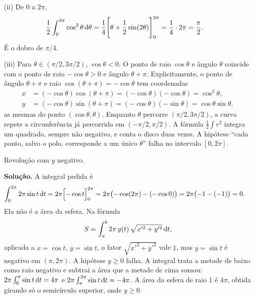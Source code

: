 \documentclass[11pt,a4paper]{article}
\begin{document}
(ii) De \(0\) a \(2\pi\),
\begin{align*}
\frac12\int_{0}^{2\pi}\cos^{2}\theta\,\mathrm{d}\theta
&=\frac14\Biggl[\theta+\frac12\sin(2\theta)\Biggr]_{0}^{2\pi}
=\frac14\cdot 2\pi
=\frac{\pi}{2}.
\end{align*}
É o dobro de \(\pi/4\).

(iii) Para \(\theta\in(\pi/2,3\pi/2)\), \(\cos\theta<0\). O ponto de raio \(\cos\theta\) e ângulo \(\theta\) coincide com o ponto de raio \(-\cos\theta>0\) e ângulo \(\theta+\pi\). Explicitamente, o ponto de ângulo \(\theta+\pi\) e raio \(\cos(\theta+\pi)=-\cos\theta\) tem coordenadas
\begin{align*}
x&=(-\cos\theta)\cos(\theta+\pi)=(-\cos\theta)(-\cos\theta)=\cos^{2}\theta,\\
y&=(-\cos\theta)\sin(\theta+\pi)=(-\cos\theta)(-\sin\theta)=\cos\theta\sin\theta,
\end{align*}
as mesmas do ponto \((\cos\theta,\theta)\). Enquanto \(\theta\) percorre \((\pi/2,3\pi/2)\), a curva repete a circunferência já percorrida em \((-\pi/2,\pi/2)\). A fórmula \(\frac12\int r^{2}\) integra um quadrado, sempre não negativo, e conta o disco duas vezes. A hipótese ``cada ponto, salvo o polo, corresponde a um único \(\theta\)'' falha no intervalo \([0,2\pi]\).

\begin{exercicio}[Avançado --- A3]
Revolução com \(y\) negativo.
\end{exercicio}

\noindent\textbf{Solução.}
A integral pedida é
\begin{align*}
\int_{0}^{2\pi} 2\pi\sin t\,\mathrm{d} t
&=2\pi\Bigl[-\cos t\Bigr]_{0}^{2\pi}
=2\pi\bigl(-\cos(2\pi)-(-\cos 0)\bigr)
=2\pi\bigl(-1-(-1)\bigr)
=0.
\end{align*}
Ela não é a área da esfera. Na fórmula
\[
S=\int_{a}^{b} 2\pi\, y(t)\,\sqrt{x'^{2}+y'^{2}}\,\mathrm{d} t,
\]
aplicada a \(x=\cos t\), \(y=\sin t\), o fator \(\sqrt{x'^{2}+y'^{2}}\) vale \(1\), mas \(y=\sin t\) é negativo em \((\pi,2\pi)\). A hipótese \(y\ge 0\) falha. A integral trata a metade de baixo como raio negativo e subtrai a área que a metade de cima somou: \(2\pi\int_{0}^{\pi}\sin t\,\mathrm{d} t=4\pi\) e \(2\pi\int_{\pi}^{2\pi}\sin t\,\mathrm{d} t=-4\pi\). A área da esfera de raio \(1\) é \(4\pi\), obtida girando só o semicírculo superior, onde \(y\ge 0\).
\end{document}
